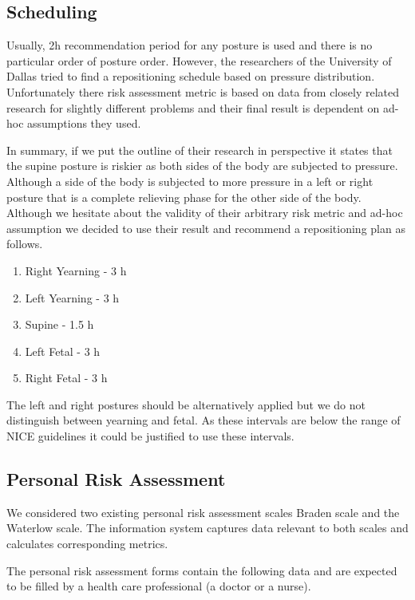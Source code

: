 \subsection{Scheduling}

Usually, 2h recommendation period for any posture is used and there is no particular order of posture order. However, the researchers of the University of Dallas tried to find a repositioning schedule based on pressure distribution. Unfortunately there risk assessment metric is based on data from closely related research for slightly different problems and their final result is dependent on ad-hoc assumptions they used. 

In summary, if we put the outline of their research in perspective it states that the supine posture is riskier as both sides of the body are subjected to pressure. Although a side of the body is subjected to more pressure in a left or right posture that is a complete relieving phase for the other side of the body. Although we hesitate about the validity of their arbitrary risk metric and ad-hoc assumption we decided to use their result and recommend a repositioning plan as follows. 

\begin{enumerate}
	\item Right Yearning - 3 h
	\item Left Yearning - 3 h
	\item Supine - 1.5 h
	\item Left Fetal - 3 h
	\item Right Fetal - 3 h
\end{enumerate}

The left and right postures should be alternatively applied but we do not distinguish between yearning and fetal. As these intervals are below the range of NICE guidelines it could be justified to use these intervals. 

\subsection{Personal Risk Assessment}

We considered two existing personal risk assessment scales Braden scale and the Waterlow scale. The information system captures data relevant to both scales and calculates corresponding metrics. 

The personal risk assessment forms contain the following data and are expected to be filled by a health care professional (a doctor or a nurse). 

